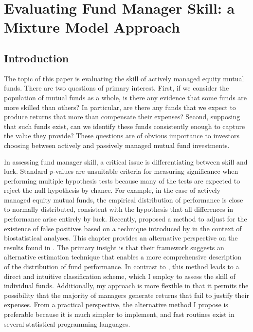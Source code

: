 \chapter{Evaluating Fund Manager Skill: a Mixture Model Approach}
\label{chapter:two}

\section{Introduction}
	The topic of this paper is evaluating the skill of actively managed equity mutual funds.  There are two questions of primary interest.  First, if we consider the population of mutual funds as a whole, is there any evidence that some funds are more skilled than others?  In particular, are there any funds that we expect to produce returns that more than compensate their expenses?  Second, supposing that such funds exist, can we identify these funds consistently enough to capture the value they provide?  These questions are of obvious importance to investors choosing between actively and passively managed mutual fund investments.

	In assessing fund manager skill, a critical issue is differentiating between skill and luck. Standard $p$-values are unsuitable criteria for measuring significance when performing multiple hypothesis tests because many of the tests are expected to reject the null hypothesis by chance.  For example, in the case of actively managed equity mutual funds, the empirical distribution of performance is close to normally distributed, consistent with the hypothesis that all differences in performance arise entirely by luck. Recently, \citet{Barras2010} proposed a method to adjust for the existence of false positives based on a technique introduced by \citet{Storey2002} in the context of biostatistical analyses. This chapter provides an alternative perspective on the results found in \citet{Barras2010}. The primary insight is that their framework suggests an alternative estimation technique that enables a more comprehensive description of the distribution of fund performance. In contrast to \citet{Barras2010}, this method leads to a direct and intuitive classification scheme, which I employ to assess the skill of individual funds.  Additionally, my approach is more flexible in that it permits the possibility that the majority of managers generate returns that fail to justify their expenses. From a practical perspective, the alternative method I propose is preferable because it is much simpler to implement, and fast routines exist in several statistical programming languages.

